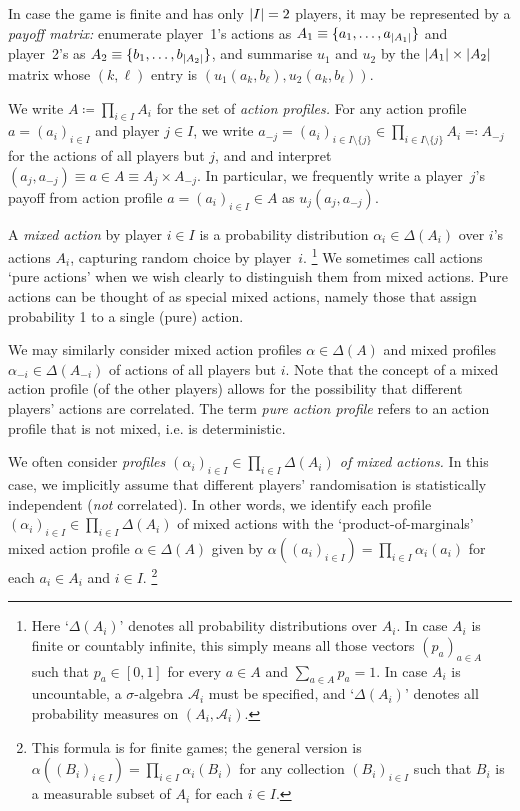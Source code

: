 \documentclass[11pt,letterpaper,reqno,oneside]{book}
\begin{document}
In case the game is finite and has only $\abs*{I}=2$ players, it may be represented by a \emph{payoff matrix:} enumerate player~1's actions as $A_1 \equiv \{a_1,\dots,a_{\abs*{A_1}}\}$ and player~2's as $A_2 \equiv \{b_1,\dots,b_{\abs*{A_2}}\}$, and summarise $u_1$ and $u_2$ by the $\abs*{A_1} \times \abs*{A_2}$ matrix whose $(k,\ell)$ entry is $\left( u_1\left( a_k, b_\ell \right), u_2\left( a_k, b_\ell \right) \right)$.

We write $A \coloneqq \prod_{i \in I} A_i$ for the set of \emph{action profiles.} For any action profile $a = (a_i)_{i \in I}$ and player $j \in I$, we write $a_{-j} = (a_i)_{i \in I \setminus \{j\}} \in \prod_{i \in I \setminus \{j\}} A_i \eqqcolon A_{-j}$ for the actions of all players but $j$, and and interpret $(a_j,a_{-j}) \equiv a \in A \equiv A_j \times A_{-j}$. In particular, we frequently write a player~$j$'s payoff from action profile $a = (a_i)_{i \in I} \in A$ as $u_j(a_j,a_{-j})$.

A \emph{mixed action} by player $i \in I$ is a probability distribution $\alpha_i \in \Delta(A_i)$ over $i$'s actions $A_i$, capturing random choice by player~$i$.%
	\footnote{Here `$\Delta(A_i)$' denotes all probability distributions over $A_i$. In case $A_i$ is finite or countably infinite, this simply means all those vectors $(p_a)_{a \in A}$ such that $p_a \in [0,1]$ for every $a \in A$ and $\sum_{a \in A} p_a = 1$. In case $A_i$ is uncountable, a $\sigma$-algebra $\mathcal{A}_i$ must be specified, and `$\Delta(A_i)$' denotes all probability measures on $(A_i,\mathcal{A}_i)$.}
We sometimes call actions `pure actions' when we wish clearly to distinguish them from mixed actions. Pure actions can be thought of as special mixed actions, namely those that assign probability 1 to a single (pure) action.

We may similarly consider mixed action profiles $\alpha \in \Delta(A)$ and mixed profiles $\alpha_{-i} \in \Delta(A_{-i})$ of actions of all players but $i$. Note that the concept of a mixed action profile (of the other players) allows for the possibility that different players' actions are correlated. The term \emph{pure action profile} refers to an action profile that is not mixed, i.e. is deterministic.

We often consider \emph{profiles $(\alpha_i)_{i \in I} \in \prod_{i \in I} \Delta(A_i)$ of mixed actions.} In this case, we implicitly assume that different players' randomisation is statistically independent (\emph{not} correlated). In other words, we identify each profile $(\alpha_i)_{i \in I} \in \prod_{i \in I} \Delta(A_i)$ of mixed actions with the `product-of-marginals' mixed action profile $\alpha \in \Delta(A)$ given by $\alpha((a_i)_{i \in I}) = \prod_{i \in I} \alpha_i(a_i)$ for each $a_i \in A_i$ and $i \in I$.%
	\footnote{This formula is for finite games; the general version is $\alpha( (B_i)_{i \in I} ) = \prod_{i \in I} \alpha_i(B_i)$ for any collection $(B_i)_{i \in I}$ such that $B_i$ is a measurable subset of $A_i$ for each $i \in I$.} 
\end{document}

